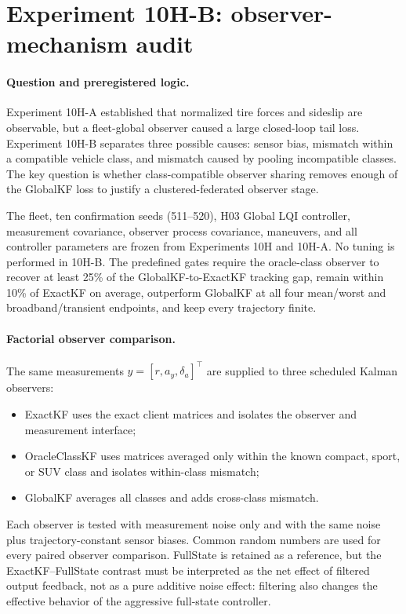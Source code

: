 \section{Experiment 10H-B: observer-mechanism audit}
\label{sec:experiment10hb}

\paragraph{Question and preregistered logic.}
Experiment 10H-A established that normalized tire forces and sideslip are
observable, but a fleet-global observer caused a large closed-loop tail loss.
Experiment 10H-B separates three possible causes: sensor bias, mismatch within
a compatible vehicle class, and mismatch caused by pooling incompatible
classes. The key question is whether class-compatible observer sharing removes
enough of the GlobalKF loss to justify a clustered-federated observer stage.

The fleet, ten confirmation seeds (511--520), H03 Global LQI controller,
measurement covariance, observer process covariance, maneuvers, and all
controller parameters are frozen from Experiments 10H and 10H-A. No tuning is
performed in 10H-B. The predefined gates require the oracle-class observer to
recover at least 25\% of the GlobalKF-to-ExactKF tracking gap, remain within
10\% of ExactKF on average, outperform GlobalKF at all four mean/worst and
broadband/transient endpoints, and keep every trajectory finite.

\paragraph{Factorial observer comparison.}
The same measurements $y=[r,a_y,\delta_a]^\top$ are supplied to three
scheduled Kalman observers:
\begin{itemize}
  \item ExactKF uses the exact client matrices and isolates the observer and
        measurement interface;
  \item OracleClassKF uses matrices averaged only within the known compact,
        sport, or SUV class and isolates within-class mismatch;
  \item GlobalKF averages all classes and adds cross-class mismatch.
\end{itemize}
Each observer is tested with measurement noise only and with the same noise
plus trajectory-constant sensor biases. Common random numbers are used for
every paired observer comparison. FullState is retained as a reference, but
the ExactKF--FullState contrast must be interpreted as the net effect of
filtered output feedback, not as a pure additive noise effect: filtering also
changes the effective behavior of the aggressive full-state controller.

